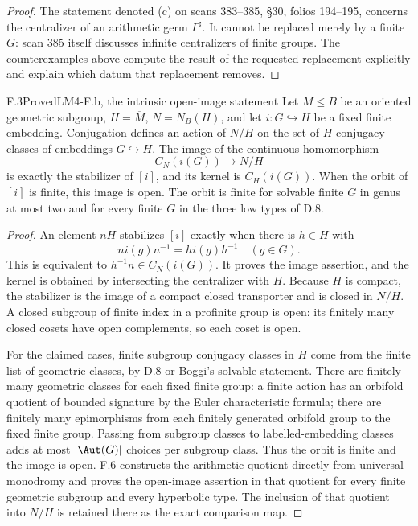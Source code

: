 \begin{proof}
The statement denoted (c) on scans 383--385, \S30, folios 194--195, concerns the centralizer of an arithmetic germ $\Gamma^{\natural}$. It cannot be replaced merely by a finite $G$: scan 385 itself discusses infinite centralizers of finite groups. The counterexamples above compute the result of the requested replacement explicitly and explain which datum that replacement removes.
\end{proof}

\begin{claim}{F.3}{Proved}{LM4-F.b, the intrinsic open-image statement}
Let $M\leq B$ be an oriented geometric subgroup, $H=\overline M$, $N=N_B(H)$, and let $i:G\hookrightarrow H$ be a fixed finite embedding. Conjugation defines an action of $N/H$ on the set of $H$-conjugacy classes of embeddings $G\hookrightarrow H$. The image of the continuous homomorphism
\[
 C_N(i(G))\longrightarrow N/H
\]
is exactly the stabilizer of $[i]$, and its kernel is $C_H(i(G))$. When the orbit of $[i]$ is finite, this image is open. The orbit is finite for solvable finite $G$ in genus at most two and for every finite $G$ in the three low types of D.8.
\end{claim}
\begin{proof}
An element $nH$ stabilizes $[i]$ exactly when there is $h\in H$ with
\[
 ni(g)n^{-1}=hi(g)h^{-1}\quad(g\in G).
\]
This is equivalent to $h^{-1}n\in C_N(i(G))$. It proves the image assertion, and the kernel is obtained by intersecting the centralizer with $H$. Because $H$ is compact, the stabilizer is the image of a compact closed transporter and is closed in $N/H$. A closed subgroup of finite index in a profinite group is open: its finitely many closed cosets have open complements, so each coset is open.

For the claimed cases, finite subgroup conjugacy classes in $H$ come from the finite list of geometric classes, by D.8 or Boggi's solvable statement. There are finitely many geometric classes for each fixed finite group: a finite action has an orbifold quotient of bounded signature by the Euler characteristic formula; there are finitely many epimorphisms from each finitely generated orbifold group to the fixed finite group. Passing from subgroup classes to labelled-embedding classes adds at most $|\Aut(G)|$ choices per subgroup class. Thus the orbit is finite and the image is open. F.6 constructs the arithmetic quotient directly from universal monodromy and proves the open-image assertion in that quotient for every finite geometric subgroup and every hyperbolic type. The inclusion of that quotient into $N/H$ is retained there as the exact comparison map.
\end{proof}

